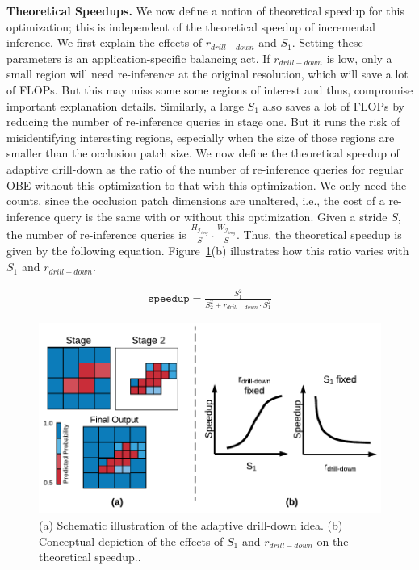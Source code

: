 \vspace{2mm}
\noindent \textbf{Theoretical Speedups.}
We now define a notion of theoretical speedup for this optimization; this is independent of the theoretical speedup of incremental inference. We first explain the effects of $r_{drill-down}$ and $S_1$. Setting these parameters is an application-specific balancing act. If $r_{drill-down}$ is low, only a small region will need re-inference at the original resolution, which will save a lot of FLOPs. But this may miss some some regions of interest and thus, compromise important explanation details. Similarly, a large $S_1$ also saves a lot of FLOPs by reducing the number of re-inference queries in stage one. But it runs the risk of misidentifying interesting regions, especially when the size of those regions are smaller than the occlusion patch size. We now define the theoretical speedup of adaptive drill-down as the ratio of the number of re-inference queries for regular OBE without this optimization to that with this optimization. We only need the counts, since the occlusion patch dimensions are unaltered, i.e., the cost of a re-inference query is the same with or without this optimization. Given a stride $S$, the number of re-inference queries is $\frac{H_{\mathcal{I}_{img}}}{S} \cdot \frac{W_{\mathcal{I}_{img}}}{S}$. Thus, the theoretical speedup is given by the following equation. Figure~\ref{fig:adaptive_drill_down}(b) illustrates how this ratio varies with $S_1$ and $r_{drill-down}$.

\vspace{-2mm}
\begin{align}
\label{eqn:adaptive-drill-down-eqn}
\texttt{speedup} = \frac{S^2_1}{S^2_2+r_{drill-down} \cdot S^2_1}
\end{align}

\begin{figure}[t]
\includegraphics[width=\columnwidth]{images/adaptive_drill_down}
\caption{(a) Schematic illustration of the adaptive drill-down idea. (b) Conceptual depiction of the effects of $S_1$ and $r_{drill-down}$ on the theoretical speedup.. }
\label{fig:adaptive_drill_down}
\vspace{-4mm}
\end{figure}

